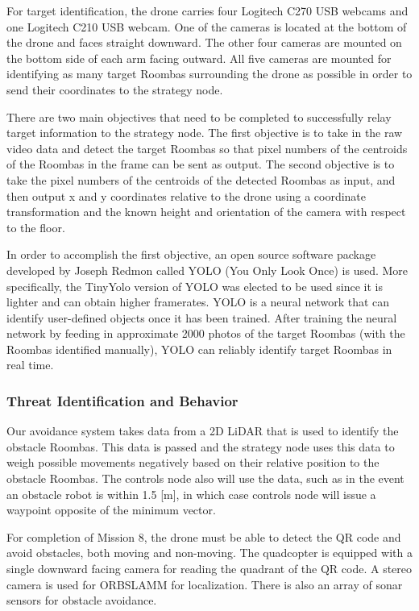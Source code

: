 \documentclass[12pt,letterpaper]{article}
\begin{document}
			
			For target identification, the drone carries four Logitech C270 USB webcams and one Logitech C210 USB webcam. One of the cameras is located at the bottom of the drone and faces straight downward. The other four cameras are mounted on the bottom side of each arm facing outward. All five cameras are mounted for identifying as many target Roombas surrounding the drone as possible in order to send their coordinates to the strategy node.
			
			There are two main objectives that need to be completed to successfully relay target information to the strategy node. The first objective is to take in the raw video data and detect the target Roombas so that pixel numbers of the centroids of the Roombas in the frame can be sent as output. The second objective is to take the pixel numbers of the centroids of the detected Roombas as input, and then output x and y coordinates relative to the drone using a coordinate transformation and the known height and orientation of the camera with respect to the floor.
			
			In order to accomplish the first objective, an open source software package developed by Joseph Redmon called YOLO (You Only Look Once) is used. More specifically, the TinyYolo version of YOLO was elected to be used since it is lighter and can obtain higher framerates. YOLO is a neural network that can identify user-defined objects once it has been trained. After training the neural network by feeding in approximate 2000 photos of the target Roombas (with the Roombas identified manually), YOLO can reliably identify target Roombas in real time.

		\subsubsection*{Threat Identification and Behavior}
			Our avoidance system takes data from a 2D LiDAR that is used to identify the obstacle Roombas. This data is passed and the strategy node uses this data to weigh possible movements negatively based on their relative position to the obstacle Roombas. The controls node also will use the data, such as in the event an obstacle robot is within 1.5 [m], in which case controls node will issue a waypoint opposite of the minimum vector.

			For completion of Mission 8, the drone must be able to detect the QR code and avoid obstacles, both moving and non-moving. The quadcopter is equipped with a single downward facing camera for reading the quadrant of the QR code. A stereo camera is used for ORBSLAMM for localization. There is also an array of sonar sensors for obstacle avoidance.
\end{document}
